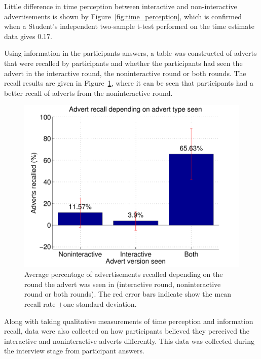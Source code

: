 	Little difference in time perception between interactive and non-interactive advertisements is shown by Figure~\ref{fig:time_perception}, which is confirmed when a Student's independent two-sample t-test performed on the time estimate data gives 0.17.

	Using information in the participants answers, a table was constructed of adverts that were recalled by participants and whether the participants had seen the advert in the interactive round, the noninteractive round or both rounds. The recall results are given in Figure~\ref{fig:recall}, where it can be seen that participants had a better recall of adverts from the noninteractive round. 
	\begin{figure}[h!]
		\centering
		\includegraphics[width=\textwidth]{images/recall.pdf}
		\caption{Average percentage of advertisements recalled depending on the round the advert was seen in (interactive round, noninteractive round or both rounds). The red error bars indicate show the mean recall rate $\pm$one standard deviation.}
		\label{fig:recall}
	\end{figure}

	Along with taking qualitative measurements of time perception and information recall, data were also collected on how participants believed they perceived the interactive and noninteractive adverts differently. This data was collected during the interview stage from participant answers. 

